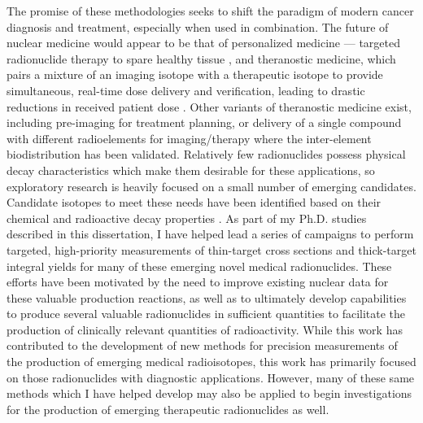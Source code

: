 The promise of these methodologies seeks to shift the paradigm of modern cancer diagnosis and treatment, especially when used in combination. 
The future of nuclear medicine would appear to be that of personalized medicine --- targeted radionuclide therapy to spare healthy tissue \cite{Mulford2005,Qaim201731}, and theranostic medicine, which pairs a mixture of an imaging isotope with a therapeutic isotope to provide simultaneous, real-time dose delivery and verification, leading to drastic reductions in received patient dose \cite{Muller2014,Bentzen2005,Srivastava2012}. 
Other variants of theranostic medicine exist, including pre-imaging for treatment planning, or delivery of a single compound with different radioelements for imaging/therapy where the inter-element biodistribution has been validated.  
Relatively few radionuclides possess physical decay characteristics which make them desirable for these applications, so exploratory research is heavily focused on a small number of emerging candidates. Candidate isotopes to meet these needs have been identified based on their chemical and radioactive decay properties \cite{Qaim201731}. 
As part of my Ph.D. studies described in this dissertation, I have helped lead a series of campaigns to perform targeted, high-priority measurements of thin-target cross sections and thick-target integral yields for many of these emerging novel medical radionuclides. 
These efforts have been motivated by the need to improve existing nuclear data for these valuable production reactions, as well as to ultimately develop capabilities to produce several valuable radionuclides in sufficient quantities to facilitate the production of clinically relevant quantities of radioactivity. 
While this work has contributed to the development of new methods for precision measurements of the production of emerging medical radioisotopes, this work has primarily focused on those radionuclides with diagnostic applications. 
However, many of these same methods which I have helped develop may also be applied to begin investigations for the production of emerging therapeutic radionuclides as well. 

